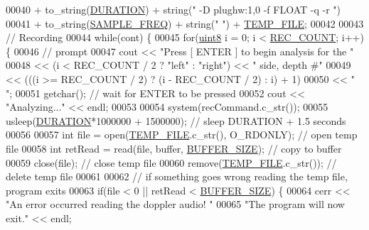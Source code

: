 \begin{DoxyCode}
00040         + to\_string(\hyperlink{definitions_8hpp_ada7a88c013312e76596a2000cc8277fb}{DURATION}) + string(\textcolor{stringliteral}{" -D plughw:1,0 -f FLOAT -q -r "})
00041         + to\_string(\hyperlink{definitions_8hpp_a8ace559345ecba7978591ac2ef22aea4}{SAMPLE\_FREQ}) + string(\textcolor{stringliteral}{" "}) + \hyperlink{definitions_8hpp_a88f32e97c41b89ff0705d0a0b8566b41}{TEMP\_FILE};
00042 
00043     \textcolor{comment}{// Recording}
00044     \textcolor{keywordflow}{while}(cont) \{
00045         \textcolor{keywordflow}{for}(\hyperlink{definitions_8hpp_adde6aaee8457bee49c2a92621fe22b79}{uint8} i = 0; i < \hyperlink{definitions_8hpp_a2fd18fd694a2918f7d73eba821fd10b2}{REC\_COUNT}; i++) \{
00046             \textcolor{comment}{// prompt}
00047             cout << \textcolor{stringliteral}{"Press [ ENTER ] to begin analysis for the "}
00048                 << (i < REC\_COUNT / 2 ? \textcolor{stringliteral}{"left"} : \textcolor{stringliteral}{"right"}) << \textcolor{stringliteral}{" side, depth #"}
00049                 << (((i >= REC\_COUNT / 2) ? (i - REC\_COUNT / 2) : i) + 1)
00050                 << \textcolor{stringliteral}{" "};
00051             getchar();  \textcolor{comment}{// wait for ENTER to be pressed}
00052             cout << \textcolor{stringliteral}{"Analyzing..."} << endl;
00053 
00054             system(recCommand.c\_str());
00055             usleep(\hyperlink{definitions_8hpp_ada7a88c013312e76596a2000cc8277fb}{DURATION}*1000000 + 1500000);  \textcolor{comment}{// sleep DURATION + 1.5 seconds}
00056 
00057             \textcolor{keywordtype}{int} file = open(\hyperlink{definitions_8hpp_a88f32e97c41b89ff0705d0a0b8566b41}{TEMP\_FILE}.c\_str(), O\_RDONLY);  \textcolor{comment}{// open temp file}
00058             \textcolor{keywordtype}{int} retRead = read(file, buffer, \hyperlink{definitions_8hpp_aca681ed285767aaa2353bf3b42dd60ed}{BUFFER\_SIZE});  \textcolor{comment}{// copy to buffer}
00059             close(file);  \textcolor{comment}{// close temp file}
00060             \textcolor{keyword}{remove}(\hyperlink{definitions_8hpp_a88f32e97c41b89ff0705d0a0b8566b41}{TEMP\_FILE}.c\_str());  \textcolor{comment}{// delete temp file}
00061 
00062             \textcolor{comment}{// if something goes wrong reading the temp file, program exits}
00063             \textcolor{keywordflow}{if}(file < 0 || retRead < \hyperlink{definitions_8hpp_aca681ed285767aaa2353bf3b42dd60ed}{BUFFER\_SIZE}) \{
00064                 cerr << \textcolor{stringliteral}{"An error occurred reading the doppler audio! "}
00065                     \textcolor{stringliteral}{"The program will now exit."} << endl;

\end{DoxyCode}
